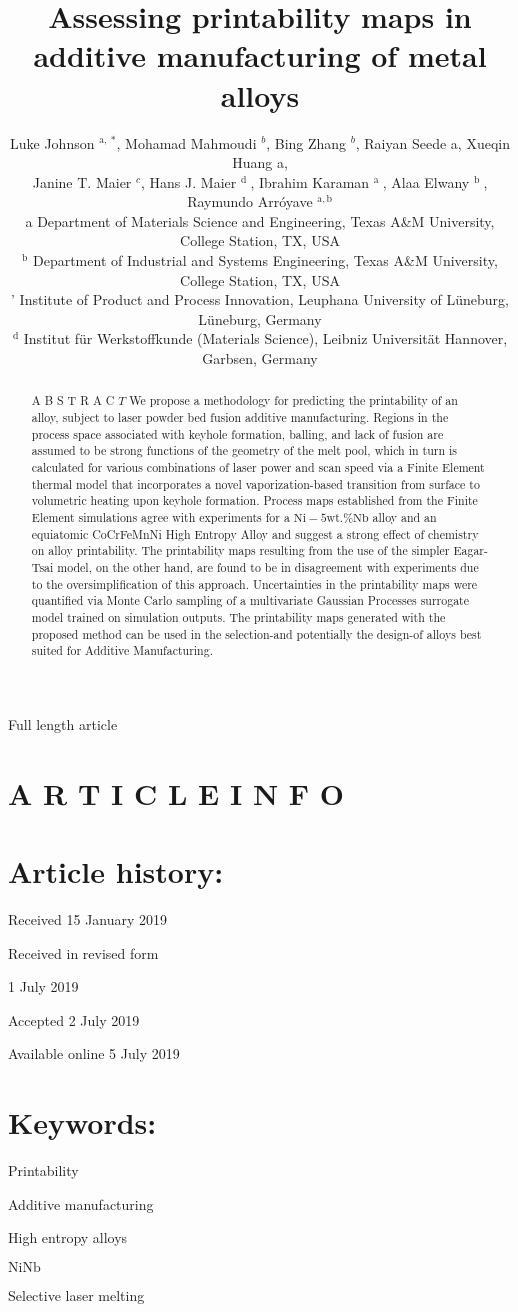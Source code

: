 \documentclass[10pt]{article}
\title{Assessing printability maps in additive manufacturing of metal alloys }
\author{Luke Johnson ${ }^{\text {a, }}{ }^{*}$, Mohamad Mahmoudi ${ }^{b}$, Bing Zhang ${ }^{b}$, Raiyan Seede a, Xueqin Huang a,\\
Janine T. Maier ${ }^{c}$, Hans J. Maier ${ }^{\text {d }}$, Ibrahim Karaman ${ }^{\text {a }}$, Alaa Elwany ${ }^{\text {b }}$,\\
Raymundo Arróyave ${ }^{\mathrm{a}, \mathrm{b}}$\\
a Department of Materials Science and Engineering, Texas A\&M University, College Station, TX, USA\\
${ }^{\mathrm{b}}$ Department of Industrial and Systems Engineering, Texas A\&M University, College Station, TX, USA\\
' Institute of Product and Process Innovation, Leuphana University of Lüneburg, Lüneburg, Germany\\
${ }^{\mathrm{d}}$ Institut für Werkstoffkunde (Materials Science), Leibniz Universität Hannover, Garbsen, Germany}
\date{}
\begin{document}
\maketitle
Full length article



\section*{A R T I C L E I N F O}
\section*{Article history:}
Received 15 January 2019

Received in revised form

1 July 2019

Accepted 2 July 2019

Available online 5 July 2019

\section*{Keywords:}
Printability

Additive manufacturing

High entropy alloys

$\mathrm{NiNb}$

Selective laser melting

\begin{abstract}
A B S T R A C $T$ We propose a methodology for predicting the printability of an alloy, subject to laser powder bed fusion additive manufacturing. Regions in the process space associated with keyhole formation, balling, and lack of fusion are assumed to be strong functions of the geometry of the melt pool, which in turn is calculated for various combinations of laser power and scan speed via a Finite Element thermal model that incorporates a novel vaporization-based transition from surface to volumetric heating upon keyhole formation. Process maps established from the Finite Element simulations agree with experiments for a $\mathrm{Ni}-5 \mathrm{wt} . \% \mathrm{Nb}$ alloy and an equiatomic CoCrFeMnNi High Entropy Alloy and suggest a strong effect of chemistry on alloy printability. The printability maps resulting from the use of the simpler Eagar-Tsai model, on the other hand, are found to be in disagreement with experiments due to the oversimplification of this approach. Uncertainties in the printability maps were quantified via Monte Carlo sampling of a multivariate Gaussian Processes surrogate model trained on simulation outputs. The printability maps generated with the proposed method can be used in the selection-and potentially the design-of alloys best suited for Additive Manufacturing.
\end{abstract}
\end{document}
